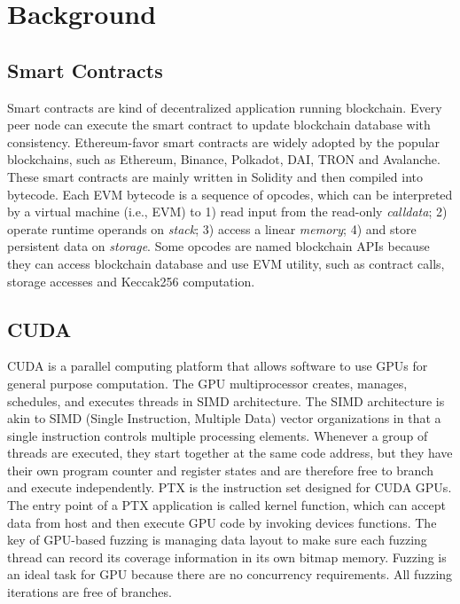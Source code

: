 \section{Background}

\subsection{Smart Contracts}
Smart contracts are kind of decentralized application running blockchain. 
Every peer node can execute the smart contract to update blockchain database with consistency. 
Ethereum-favor smart contracts are widely adopted by the popular blockchains, such as Ethereum\cite{wood2014ethereum}, Binance\cite{binance2021whitepaper}, Polkadot\cite{polkadot2021whitepaper}, DAI\cite{dai2021paper}, TRON\cite{tron2021paper} and Avalanche\cite{avalab2021paper}.
These smart contracts are mainly written in Solidity\cite{solidity} and then compiled into bytecode.
Each EVM bytecode is a sequence of opcodes, which can be interpreted by a virtual machine (i.e., EVM) to 1) read input from the read-only \textit{calldata}; 2) operate runtime operands on \textit{stack}; 3) access a linear \textit{memory}; 4) and store persistent data on \textit{storage}.
Some opcodes are named blockchain APIs because they can access blockchain database and use EVM utility, such as contract calls, storage accesses and Keccak256 computation\cite{bertoni2013keccak}. 

\subsection{CUDA}
CUDA\cite{nvidia2021cuda} is a parallel computing platform that allows software to use GPUs for general purpose computation. 
The GPU multiprocessor creates, manages, schedules, and executes threads in SIMD architecture.
The SIMD architecture is akin to SIMD (Single Instruction, Multiple Data) vector organizations in that a single instruction controls multiple processing elements.
Whenever a group of threads are executed, they start together at the same code address, but they have their own program counter and register states and are therefore free to branch and execute independently.
PTX is the instruction set designed for CUDA GPUs.
The entry point of a PTX application is called kernel function, which can accept data from host and then execute GPU code by invoking devices functions. 
%
The key of GPU-based fuzzing is managing data layout to make sure each fuzzing thread can record its coverage information in its own bitmap memory.   
Fuzzing is an ideal task for GPU because there are no concurrency requirements. All fuzzing iterations are free of branches.